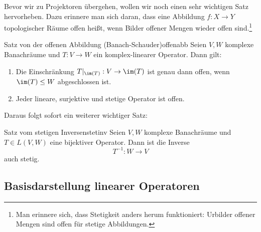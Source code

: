 Bevor wir zu Projektoren übergehen, wollen wir noch einen sehr wichtigen Satz hervorheben. Dazu erinnere man sich daran, dass eine Abbildung $f: X \to Y$ topologischer Räume offen heißt, wenn Bilder offener Mengen wieder offen sind.\footnote{Man erinnere sich, dass Stetigkeit anders herum funktioniert: Urbilder offener Mengen sind offen für stetige Abbildungen.}
\begin{theorem}{Satz von der offenen Abbildung (Banach-Schauder)}{offenabb}
Seien $V,W$ komplexe Banachräume und $T: V \to W$ ein komplex-linearer Operator. Dann gilt:
\begin{enumerate}
	\item Die Einschränkung $T|_{\im(T)}: V \to \im(T)$ ist genau dann offen, wenn $\im(T) \leq W$ abgeschlossen ist.
	\item Jeder lineare, surjektive und stetige Operator ist offen.
\end{enumerate}

\end{theorem}

Daraus folgt sofort ein weiterer wichtiger Satz:
\begin{satz}{Satz vom stetigen Inversen}{stetinv}
Seien $V,W$ komplexe Banachräume und $T \in L(V,W)$ eine bijektiver Operator. Dann ist die Inverse
\[
T^{-1}: W \to V
\]
auch stetig.
\end{satz}

\subsection{Basisdarstellung linearer Operatoren}

